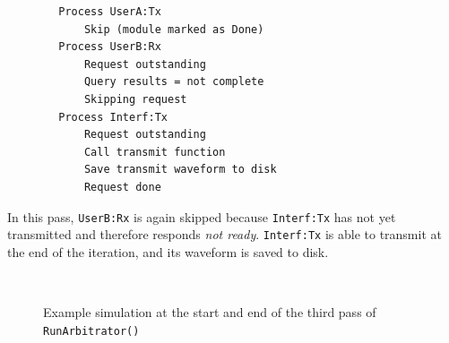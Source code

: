 \begin{verbatim}
        Process UserA:Tx
            Skip (module marked as Done)
        Process UserB:Rx
            Request outstanding
            Query results = not complete
            Skipping request
        Process Interf:Tx
            Request outstanding
            Call transmit function
            Save transmit waveform to disk
            Request done
\end{verbatim}

In this pass, \verb+UserB:Rx+ is again skipped because
\verb+Interf:Tx+ has not yet transmitted and therefore responds
\emph{not ready}.  \verb+Interf:Tx+ is able to transmit at the end
of the iteration, and its waveform is saved to disk.

\begin{figure}[!h]
\centering \mbox{
     \quad
} \caption[Arbitrator Example: Loop 3]{Example simulation at the
start and end of the third pass of \tt{RunArbitrator()}}
\label{fig:arbitEx3}
\end{figure}


